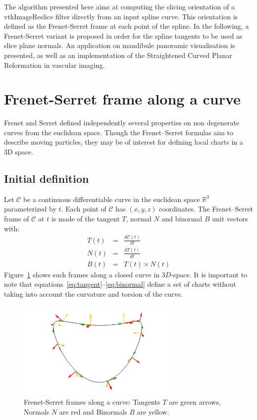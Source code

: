 \documentclass{InsightArticle}
\begin{document}
The algorithm presented here aims at computing the slicing orientation of a
vtkImageReslice filter directly from an input spline curve. This orientation
is defined as the Frenet-Serret frame at each point of the spline. In the 
following, a Frenet-Serret variant is proposed in order for the spline tangents
to be used as slice plane normals. An application on mandibule panoramic 
visualisation is presented, as well as an implementation of the Straightened
Curved Planar Reformation in vascular imaging.
%
\section{Frenet-Serret frame along a curve}
Frenet \cite{FRE52} and Serret \cite{SER51} defined independently several
properties on non degenerate curves from the euclidean space. Though the 
Frenet--Serret formulas aim to describe moving particles, they may be of
interest for defining local charts in a 3D space. 
%
\subsection{Initial definition}
%
Let $\mathcal{C}$ be a continuous differentiable curve in the euclidean space
$\mathbb{R}^3$ parameterized by $t$. Each point of $\mathcal{C}$ has $(x,y,z)$
coordinates. The Frenet--Serret frame of $\mathcal{C}$ at $t$ is made of the 
tangent $T$, normal $N$ and binormal $B$ unit vectors with:
\begin{eqnarray}
T(t) &=& \frac{d\mathcal{C}(t)}{dt}\label{eq:tangent}\\
N(t) &=& \frac{dT(t)}{dt}\label{eq:normal}\\
B(t) &=& T(t)\times N(t)\label{eq:binormal}
\end{eqnarray}
%
Figure~\ref{fig:frenet-serret_frames} shows such frames along a closed curve
in $3D$-space. It is important to note that equations~\eqref{eq:tangent}--\eqref{eq:binormal}
define a set of charts without taking into account the curvature and torsion of
the curve. 
%
\begin{figure}
\centering
\includegraphics[width=0.7\textwidth]{Images/frenet-serret_frames}
\caption{Frenet-Serret frames along a curve: Tangents $T$ are green arrows,
Normals $N$ are red and Binormals $B$ are yellow.}
\label{fig:frenet-serret_frames}
\end{figure}
%
\end{document}
